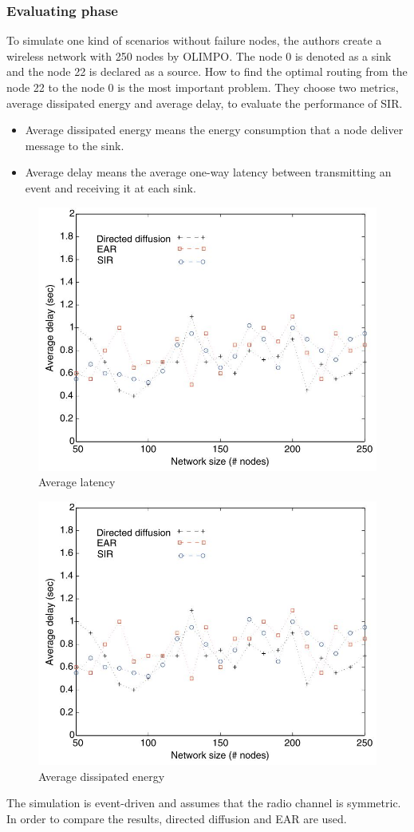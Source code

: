 \documentclass[11pt]{report}
\begin{document}
	\subsubsection{Evaluating phase}
	To simulate one kind of scenarios without failure nodes, the authors create a wireless network with 250 nodes by OLIMPO. The node 0 is denoted as a sink and the node 22 is declared as a source. How to find the optimal routing from the node 22 to the node 0 is the most important problem. They choose two metrics, average dissipated energy and average delay, to evaluate the performance of SIR.
	\begin{itemize}
		\item Average dissipated energy means the energy consumption that a node deliver message to the sink. 
	\end{itemize}
	\begin{itemize}
		\item Average delay means the average one-way latency between transmitting an event and receiving it at each sink.
	\end{itemize}
 	\begin{figure}[h]
		\centering
		\includegraphics[width=0.5\linewidth]{figure2.jpg}
		\caption{Average latency}
		\label{1stfig}
	\end{figure}

	\begin{figure}[h]
		\centering
		\includegraphics[width=0.5\linewidth]{figure2.jpg}
		\caption{Average dissipated energy}
		\label{1stfig}
	\end{figure}
   	\noindent The simulation is event-driven and assumes that the radio channel is symmetric. In order to compare the results, directed diffusion and EAR are used.
    
\end{document}
